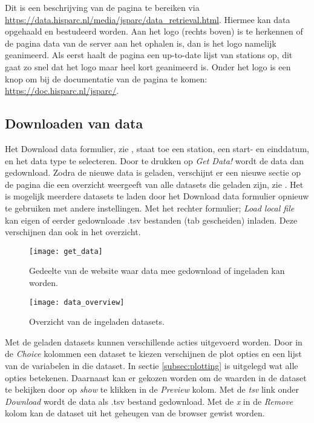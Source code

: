 Dit is een beschrijving van de pagina te bereiken via
\url{https://data.hisparc.nl/media/jsparc/data_retrieval.html}. Hiermee
kan data opgehaald en bestudeerd worden. Aan het \hisparc logo (rechts
boven) is te herkennen of de pagina data van de \hisparc server aan het
ophalen is, dan is het logo namelijk geanimeerd. Als eerst haalt de
pagina een up-to-date lijst van \hisparc stations op, dit gaat zo snel
dat het logo maar heel kort geanimeerd is. Onder het logo is een knop om bij
de documentatie van de pagina te komen: \url{https://doc.hisparc.nl/jsparc/}.


\subsection{Downloaden van data}

Het Download data formulier, zie , staat toe
een \hisparc station, een start- en einddatum, en het data type te
selecteren. Door te drukken op \emph{Get Data!} wordt de data dan
gedownload. Zodra de nieuwe data is geladen, verschijnt er een nieuwe
sectie op de pagina die een overzicht weergeeft van alle datasets die
geladen zijn, zie . Het is mogelijk meerdere
datasets te laden door het Download data formulier opnieuw te gebruiken
met andere instellingen. Met het rechter formulier; \emph{Load local
file} kan eigen of eerder gedownloade .tsv bestanden (tab
gescheiden) inladen. Deze verschijnen dan ook in het overzicht.

\begin{figure}
    \centering
    \texttt{[image: get\_data]}
    \caption{Gedeelte van de website waar data mee gedownload of
             ingeladen kan worden.}
    \label{fig:get_data}
\end{figure}

\begin{figure}
    \centering
    \texttt{[image: data\_overview]}
    \caption{Overzicht van de ingeladen datasets.}
    \label{fig:data_overview}
\end{figure}

Met de geladen datasets kunnen verschillende acties uitgevoerd worden.
Door in de \emph{Choice} kolommen een dataset te kiezen verschijnen de
plot opties en een lijst van de variabelen in die dataset. In sectie
\ref{subsec:plotting} is uitgelegd wat alle opties betekenen. Daarnaast
kan er gekozen worden om de waarden in de dataset te bekijken door op
\emph{show} te klikken in de \emph{Preview} kolom. Met de \emph{tsv}
link onder \emph{Download} wordt de data als .tsv bestand gedownload.
Met de \emph{x} in de \emph{Remove} kolom kan de dataset uit het geheugen
van de browser gewist worden.


